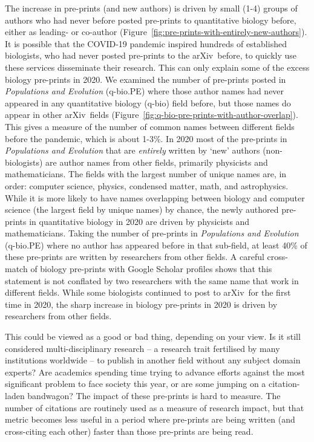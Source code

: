 \documentclass{nature}
\newcommand{\arxiv}{arXiv}
\begin{document}
The increase in pre-prints (and new authors) is driven by small (1-4) groups of authors who had never before posted pre-prints to quantitative biology before, either as leading- or co-author  (Figure~\ref{fig:pre-prints-with-entirely-new-authors}). It is possible that the COVID-19 pandemic inspired hundreds of established biologists, who had never posted pre-prints to the \arxiv\ before, to quickly use these services disseminate their research. This can only explain some of the excess biology pre-prints in 2020. 
We examined the number of pre-prints posted in \emph{Populations and Evolution} (q-bio.PE) where those author names had never appeared in any quantitative biology (q-bio) field before, but those names do appear in other \arxiv\ fields (Figure~\ref{fig:q-bio-pre-prints-with-author-overlap}). This gives a measure of the number of common names between different fields before the pandemic, which is about 1-3\%. In 2020 most of the pre-prints in \emph{Populations and Evolution} that are \emph{entirely} written by `new' authors (non-biologists) are author names from other fields, primarily physicists and mathematicians. The fields with the largest number of unique names are, in order: computer science, physics, condensed matter, math, and astrophysics. While it is more likely to have names overlapping between biology and computer science (the largest field by unique names) by chance, the newly authored pre-prints in quantitative biology in 2020 are driven by physicists and mathematicians. 
Taking the number of pre-prints in \emph{Populations and Evolution} (q-bio.PE) where no author has appeared before in that sub-field, at least 40\% of these pre-prints are written by researchers from other fields. A careful cross-match of biology pre-prints with Google Scholar profiles shows that this statement is not conflated by two researchers with the same name that work in different fields. While some biologists continued to post to \arxiv\ for the first time in 2020, the sharp increase in biology pre-prints in 2020 is driven by researchers from other fields.


This could be viewed as a good or bad thing, depending on your view. Is it still considered multi-disciplinary research -- a research trait fertilised by many institutions worldwide -- to publish in another field without any subject domain experts? Are academics spending time trying to advance efforts against the most significant problem to face society this year, or are some jumping on a citation-laden bandwagon? The impact of these pre-prints is hard to measure. The number of citations are routinely used as a measure of research impact, but that metric becomes less useful in a period where pre-prints are being written (and cross-citing each other) faster than those pre-prints are being read.
\end{document}
